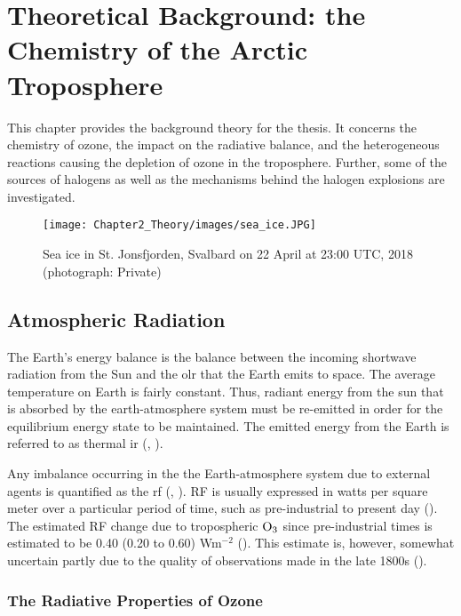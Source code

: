 \setcounter{chapter}{1} 
\chapter{Theoretical Background: the Chemistry of the Arctic Troposphere} \label{ch:theoretical_back}

This chapter provides the background theory for the thesis. It concerns the chemistry of ozone, the impact on the radiative balance, and the heterogeneous reactions causing the depletion of ozone in the troposphere. Further, some of the sources of halogens as well as the mechanisms behind the halogen explosions are investigated. 

\begin{figure}
    \centering
    \texttt{[image: Chapter2\_Theory/images/sea\_ice.JPG]}
    \caption{Sea ice in St. Jonsfjorden, Svalbard on 22 April at 23:00 UTC, 2018 (photograph: Private)}
    \label{fig:sea_ice}
\end{figure}


\section{Atmospheric Radiation}\label{sec:atm_rad}

The Earth's energy balance is the balance between the incoming shortwave radiation from the Sun and the \acrfull{olr} that the Earth emits to space. The average temperature on Earth is fairly constant. Thus, radiant energy from the sun that is absorbed by the earth-atmosphere system must be re-emitted in order for the equilibrium energy state to be maintained. The emitted energy from the Earth is referred to as thermal \acrfull{ir} (\cite{Liou_AtmRad}, \cite{SeinfeldSpyros}). 

\medskip

Any imbalance occurring in the the Earth-atmosphere system due to external agents is quantified as the \acrfull{rf} (\cite{IPCCchapter8}, \cite{Bowman2013}). RF is usually expressed in watts per square meter over a particular period of time, such as pre-industrial to present day (\cite{IPCCchapter8}). The estimated RF change due to tropospheric $\mathrm{O_3}$ since pre-industrial times is estimated to be 0.40 (0.20 to 0.60) Wm$^{-2}$ (\cite{IPCCchapter8}). This estimate is, however, somewhat uncertain partly due to the quality of observations made in the late 1800s (\cite{Tarasick2019}).


\subsection{The Radiative Properties of Ozone}\label{sec:rad_ozone}

